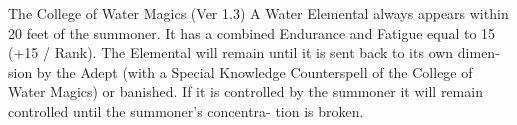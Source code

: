 \begin{Chapter}{The College of Water Magics (Ver 1.3)}
A  Water  Elemental  always  appears  within  20  feet 
of the summoner. It has a combined Endurance and 
Fatigue  equal  to  15  (+15  /  Rank).  The  Elemental 
will  remain  until  it  is  sent  back  to  its  own  dimen-
sion  by  the  Adept  (with  a  Special  Knowledge 
Counterspell  of  the  College  of  Water  Magics)  or 
banished. If it is controlled by the summoner it will 
remain controlled until the summoner’s concentra-
tion is broken. 

\end{Chapter}
